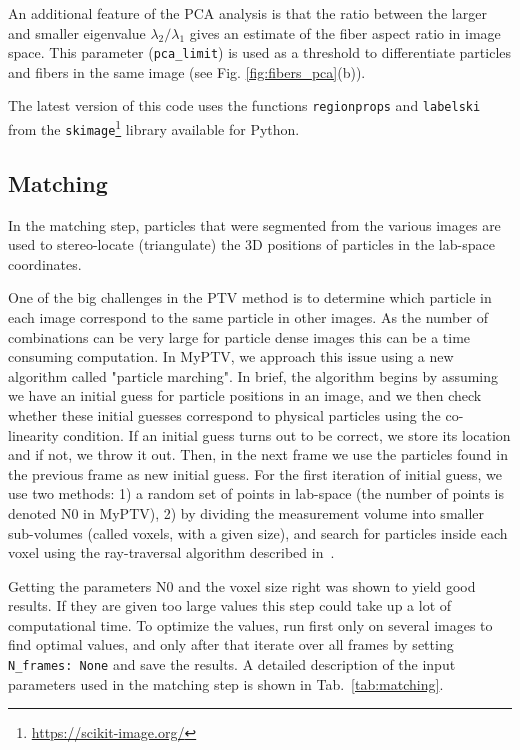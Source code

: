 \documentclass[10pt,a4paper]{article}
\begin{document}
An additional feature of the PCA analysis is that the ratio between the larger and smaller eigenvalue $ \lambda_2 / \lambda_1$ gives an estimate of the fiber aspect ratio in image space. This parameter (\texttt{pca\_limit}) is used as a threshold to differentiate particles and fibers in the same image (see Fig. \ref{fig:fibers_pca}(b)).

The latest version of this code uses the functions \texttt{regionprops} and \texttt{labelski} from the \texttt{skimage}\footnote{\url{https://scikit-image.org/}} library available for Python.

%
%








\subsection{Matching}\label{sec:workflow_match}

In the matching step, particles that were segmented from the various images are used to stereo-locate (triangulate) the 3D positions of particles in the lab-space coordinates. 



One of the big challenges in the PTV method is to determine which particle in each image correspond to the same particle in other images. As the number of combinations can be very large for particle dense images this can be a time consuming computation. In MyPTV, we approach this issue using a new algorithm called "particle marching". In brief, the algorithm begins by assuming we have an initial guess for particle positions in an image, and we then check whether these initial guesses correspond to physical particles using the co-linearity condition. If an initial guess turns out to be correct, we store its location and if not, we throw it out. Then, in the next frame we use the particles found in the previous frame as new initial guess. For the first iteration of initial guess, we use two methods: 1) a random set of points in lab-space (the number of points is denoted N0 in MyPTV), 2) by dividing the measurement volume into smaller sub-volumes (called voxels, with a given size), and search for particles inside each voxel using the ray-traversal algorithm described in~\cite{Bourgoin2020}.
     

Getting the parameters N0 and the voxel size right was shown to yield good results. If they are given too large values this step could take up a lot of computational time. To optimize the values, run first only on several images to find optimal values, and only after that iterate over all frames by setting \texttt{N\_frames: None} and save the results. 
A detailed description of the input parameters used in the matching step is shown in Tab.~\ref{tab:matching}.
\end{document}
